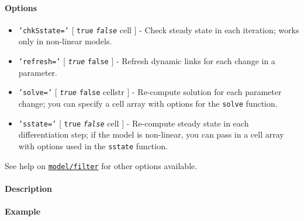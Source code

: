 \paragraph{Options}\label{options}

\begin{itemize}
\item
  \texttt{'chkSstate='} {[} \texttt{true} \textbar{}
  \emph{\texttt{false}} \textbar{} cell {]} - Check steady state in each
  iteration; works only in non-linear models.
\item
  \texttt{'refresh='} {[} \emph{\texttt{true}} \textbar{} \texttt{false}
  {]} - Refresh dynamic links for each change in a parameter.
\item
  \texttt{'solve='} {[} \emph{\texttt{true}} \textbar{} \texttt{false}
  \textbar{} cellstr {]} - Re-compute solution for each parameter
  change; you can specify a cell array with options for the
  \texttt{solve} function.
\item
  \texttt{'sstate='} {[} \texttt{true} \textbar{} \emph{\texttt{false}}
  \textbar{} cell {]} - Re-compute steady state in each differentiation
  step; if the model is non-linear, you can pass in a cell array with
  options used in the \texttt{sstate} function.
\end{itemize}

See help on \href{model/filter}{\texttt{model/filter}} for other options
available.

\paragraph{Description}\label{description}

\paragraph{Example}\label{example}


